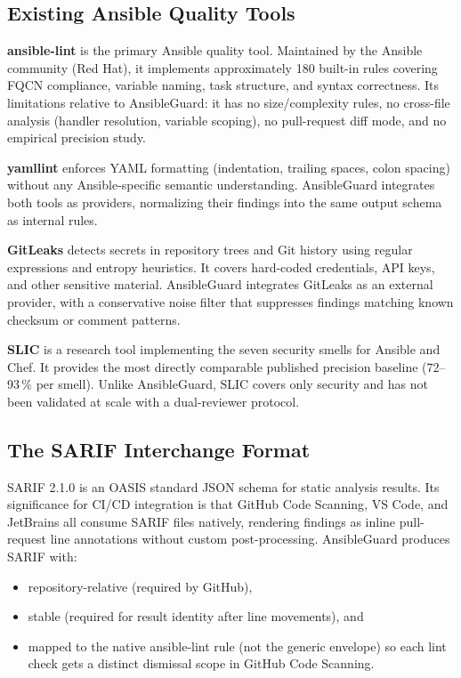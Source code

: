 \subsection{Existing Ansible Quality Tools}

\textbf{ansible-lint}\cite{ansiblelint_docs} is the primary Ansible quality
tool. Maintained by the Ansible community (Red Hat), it implements
approximately 180 built-in rules covering \ac{FQCN} compliance, variable naming,
task structure, and syntax correctness. Its limitations relative to AnsibleGuard:
it has no size/complexity rules, no cross-file analysis (handler resolution,
variable scoping), no pull-request diff mode, and no empirical precision study.

\medskip\noindent
\textbf{yamllint}\cite{yamllint_docs} enforces YAML formatting (indentation,
trailing spaces, colon spacing) without any Ansible-specific semantic understanding.
AnsibleGuard integrates both tools as providers, normalizing their findings into
the same output schema as internal rules.

\medskip\noindent
\textbf{GitLeaks}\cite{gitleaks_github} detects secrets in repository trees
and Git history using regular expressions and entropy heuristics. It covers
hard-coded credentials, API keys, and other sensitive material. AnsibleGuard
integrates GitLeaks as an external provider, with a conservative noise filter
that suppresses findings matching known checksum or comment patterns.

\medskip\noindent
\textbf{SLIC} \cite{rahman2019security} is a research tool implementing the
seven security smells for Ansible and Chef. It provides the most directly
comparable published precision baseline (72–93\,\% per smell). Unlike
AnsibleGuard, SLIC covers only security and has not been validated at scale
with a dual-reviewer protocol.

\subsection{The SARIF Interchange Format}

SARIF 2.1.0 \cite{oasis2019sarif} is an OASIS standard JSON schema for static
analysis results. Its significance for CI/CD integration is that GitHub Code
Scanning\cite{github_sarif}, VS Code, and JetBrains all consume SARIF files
natively, rendering findings as inline pull-request line annotations without
custom post-processing. AnsibleGuard produces SARIF with:
\begin{itemize}
  \item repository-relative  (required by GitHub),
  \item stable  (required
        for result identity after line movements), and
  \item {} mapped to the native ansible-lint rule (not the generic
         envelope) so each lint check gets a distinct
        dismissal scope in GitHub Code Scanning.
\end{itemize}

